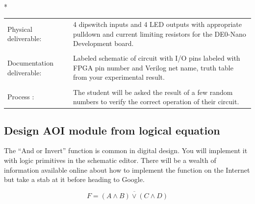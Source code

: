       \vspace{15px}
      \begin{centering}
        \begin{fminipage}{.43\textwidth}
          \vspace{3px}
          \\*
          \vspace{10px}
          \begin{tabular}{p{1.8cm}  p{5.4cm}}
            \raggedright Physical deliverable:        &4 dipswitch inputs and 4 LED outputs with appropriate pulldown and current limiting resistors for the DE0-Nano Development board. \\
            \\
            \raggedright Documentation deliverable:   & Labeled schematic of circuit with I/O pins labeled with FPGA pin number and Verilog net name,  truth table from your  experimental result.\\
            \\
            Process :                                 & The student will be asked the result of a few random numbers to verify the correct operation of their circuit.
          \end{tabular}
        \end{fminipage}
      \end{centering}

      \subsection{Design AOI module from logical equation} 
        The ``And or Invert'' function is common in digital design. You will implement it with logic primitives in the schematic editor. There will be a wealth of information available online about how to implement the function on the Internet but take a stab at it before heading to Google.

      \begin{displaymath}
        F = \overline{(A \wedge B) \vee (C \wedge D)}
      \end{displaymath}

